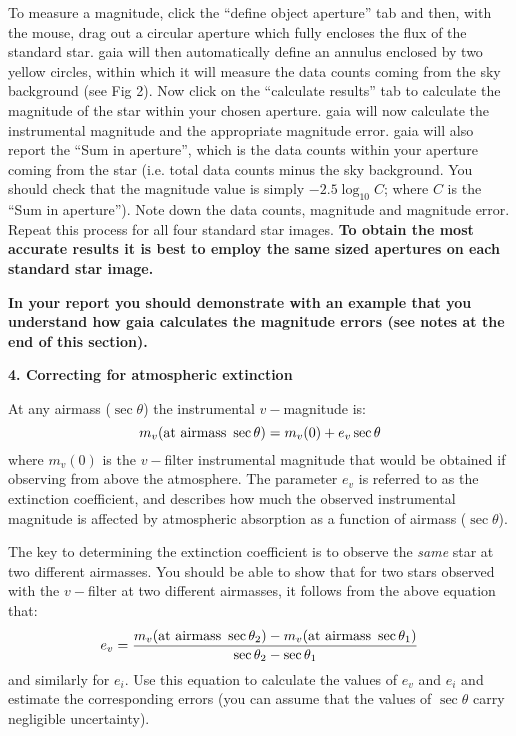 To measure a magnitude, click the ``define object aperture'' tab and
then, with the mouse, drag out a circular aperture which fully
encloses the flux of the standard star. {\sc gaia} will then automatically define
an annulus enclosed by two yellow circles, within which it will
measure the data counts coming from the sky background (see Fig 2). Now click on the
``calculate results'' tab to calculate the magnitude of the star within your chosen aperture. 
{\sc gaia} will now calculate the instrumental magnitude and the
appropriate magnitude error. {\sc gaia} will also report the ``Sum in
aperture'', which is the data counts within your aperture coming from
the star (i.e. total data counts minus the sky background. You should
check that the magnitude value is simply $-2.5\log_{10} C$; where
$C$ is the ``Sum in aperture''). Note down the data counts, magnitude
and magnitude error. Repeat this process for all four standard star images.
{\bf To obtain the most accurate results it is best to employ the same
sized apertures on each standard star image.}


\newpage
{\bf In your report you should demonstrate with an example that you
understand how {\sc gaia} calculates the magnitude errors (see notes
at the end of this section).}



{\large{\bf 4. Correcting for atmospheric extinction}}

At any airmass ($\sec \theta$) the instrumental $v-$magnitude is:
\[   m_v({\rm at\ airmass\ }\sec \theta) = m_v(0) + e_v\sec \theta   \]
where $m_v(0)$ is the $v-$filter instrumental magnitude that would be obtained if 
observing from above the atmosphere. The parameter $e_v$ is referred
to as the extinction coefficient, and describes how much the observed
instrumental magnitude is affected by atmospheric absorption as a
function of airmass ($\sec \theta$).

The key to determining the extinction coefficient is to observe the
{\it same} star at two different airmasses. You should be able to show
that for two stars observed with the $v-$filter at two different
airmasses, it follows from the above equation that:
\[   e_v = \frac{m_v({\rm at\ airmass\ }\sec \theta_2)-m_v({\rm at\
airmass\ }\sec \theta_1)}{\sec \theta_2 - \sec \theta_1}   \]
and similarly for $e_i$. Use this equation to calculate the values of $e_v$ and $e_i$ and
estimate the corresponding errors (you can assume that the values of
$\sec \theta$ carry negligible uncertainty).

